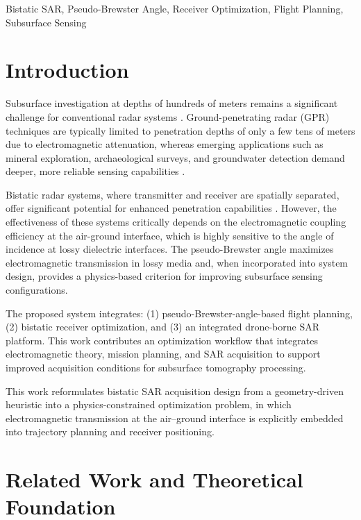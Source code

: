 \documentclass[conference]{IEEEtran}
\begin{document}
\begin{IEEEkeywords}
Bistatic SAR, Pseudo-Brewster Angle, Receiver Optimization, Flight Planning, Subsurface Sensing
\end{IEEEkeywords}

\section{Introduction}

Subsurface investigation at depths of hundreds of meters remains a significant challenge for conventional radar systems \cite{daniels_gpr}. Ground-penetrating radar (GPR) techniques are typically limited to penetration depths of only a few tens of meters due to electromagnetic attenuation, whereas emerging applications such as mineral exploration, archaeological surveys, and groundwater detection demand deeper, more reliable sensing capabilities \cite{Soil}.

Bistatic radar systems, where transmitter and receiver are spatially separated, offer significant potential for enhanced penetration capabilities \cite{cherniakov_bistatic}. However, the effectiveness of these systems critically depends on the electromagnetic coupling efficiency at the air-ground interface, which is highly sensitive to the angle of incidence at lossy dielectric interfaces.
The pseudo-Brewster angle maximizes electromagnetic transmission in lossy media \cite{mcmichael_brewster} and, when incorporated into system design, provides a physics-based criterion for improving subsurface sensing configurations.

The proposed system integrates: (1) pseudo-Brewster-angle-based flight planning, (2) bistatic receiver optimization, and (3) an integrated drone-borne SAR platform. This work contributes an optimization workflow that integrates electromagnetic theory, mission planning, and SAR acquisition to support improved acquisition conditions for subsurface tomography processing.

This work reformulates bistatic SAR acquisition design from a geometry-driven heuristic into a physics-constrained optimization problem, in which electromagnetic transmission at the air–ground interface is explicitly embedded into trajectory planning and receiver positioning.

\section{Related Work and Theoretical Foundation}
\end{document}
